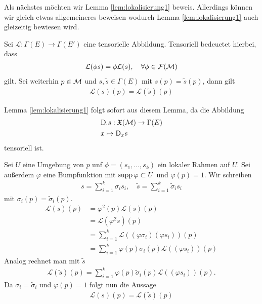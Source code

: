 
Als nächstes möchten wir Lemma \ref{lem:lokalisierung1} beweis.
Allerdings können wir gleich etwas allgemeineres beweisen wodurch Lemma \ref{lem:lokalisierung1} auch gleizeitig bewiesen wird.

\begin{lem}
\label{lem:tensorielllokalisierung}
Sei $\mathcal{L}: \Gamma (E) \to \Gamma(E')$ eine tensorielle Abbildung. 
Tensoriell bedeuetet hierbei, dass
\begin{align}
\mathcal{L}(\phi s) = \phi \mathcal{L}(s), \quad \forall \phi \in \mathcal{F}(\mathcal{M})
\end{align}
gilt.
Sei weiterhin $p\in \mathcal{M}$ und $s, \tilde{s} \in \Gamma(E)$ mit $s(p) = \tilde{s}(p)$, dann gilt
\begin{align}
\mathcal{L}(s)(p) = \mathcal{L}(\tilde{s})(p)
\end{align} 
\end{lem}
Lemma \ref{lem:lokalisierung1} folgt sofort aus diesem Lemma, da die Abbildung
\begin{align}
&\mathrm{D}_\cdot s : \mathfrak{X}(\mathcal{M}) \to \Gamma (E)\\
& x \mapsto \mathrm{D}_x s
\end{align}
tensoriell ist.

\begin{bew}
Sei $U$ eine Umgebung von $p$ unf $\phi = (s_1, \dots, s_k)$ ein lokaler Rahmen auf $U$.
Sei außerdem $\varphi$ eine Bumpfunktion mit $\operatorname{supp} \varphi \subset U$ und $\varphi (p) = 1$.
Wir schreiben 
\begin{align}
s = \sum_{i=1}^k \sigma_i s_i , \quad \tilde{s} = \sum_{i=1}^k \tilde{\sigma}_i s_i
\end{align}
mit $\sigma_i (p) = \tilde{\sigma}_i (p)$.
\begin{align}
\mathcal{L}(s)(p) &= \varphi^2 (p) \mathcal{L}(s)(p)\\
&= \mathcal{L}(\varphi^2 s)(p)\\
&= \sum_{i = 1}^k \mathcal{L}((\varphi \sigma_i)(\varphi s_i)) (p)\\
&= \sum_{i = 1}^k \varphi (p) \sigma_i (p) \mathcal{L}((\varphi s_i)) (p) 
\end{align}
Analog rechnet man mit $\tilde{s}$
\begin{align}
\mathcal{L}(\tilde{s})(p) = \sum_{i = 1}^k \varphi (p) \tilde{\sigma}_i (p) \mathcal{L}((\varphi s_i)) (p) .
\end{align}
Da $\sigma_i = \tilde{\sigma}_i$ und $\varphi(p)=1$ folgt nun die Aussage
\begin{align}
\mathcal{L}(s)(p) = \mathcal{L}(\tilde{s})(p)
\end{align}
\end{bew}

